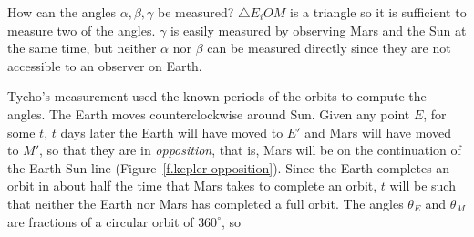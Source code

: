 How can the angles $\alpha, \beta, \gamma$ be measured? $\triangle E_iOM$ is a triangle so it is sufficient to measure two of the angles. $\gamma$ is easily measured by observing Mars and the Sun at the same time, but neither $\alpha$ nor $\beta$ can be measured directly since they are not accessible to an observer on Earth.

Tycho's measurement used the known periods of the orbits to compute the angles. The Earth moves counterclockwise around Sun. Given any point $E$, for some $t$, $t$ days later the Earth will have moved to $E'$ and Mars will have moved to $M'$, so that they are in \emph{opposition}, that is, Mars will be on the continuation of the Earth-Sun line (Figure~\ref{f.kepler-opposition}). Since the Earth completes an orbit in about half the time that Mars takes to complete an orbit, $t$ will be such that neither the Earth nor Mars has completed a full orbit. The angles $\theta_E$ and $\theta_M$ are fractions of a circular orbit of $360^\circ$, so
%
%
